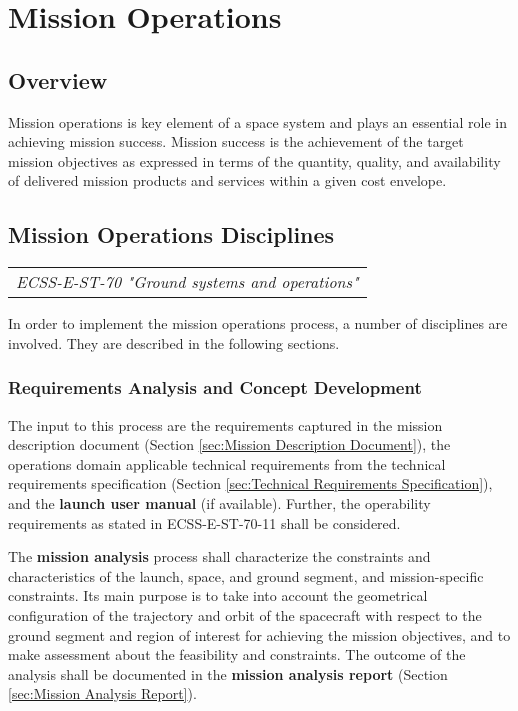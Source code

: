\chapter{Mission Operations}
\label{chap:Mission Operations}

\section{Overview}

Mission operations is key element of a space system and plays an essential role in achieving mission success. Mission success is the achievement of the target mission objectives as expressed in terms of the quantity, quality, and availability of delivered mission products and services within a given cost envelope.

\section{Mission Operations Disciplines}

\begin{tabular}{l}
\textit{ECSS-E-ST-70 "Ground systems and operations" \cite{ECSS-E-ST-70}}
\end{tabular}

In order to implement the mission operations process, a number of disciplines are involved. They are described in the following sections.

\subsection{Requirements Analysis and Concept Development}

The input to this process are the requirements captured in the mission description document (Section \ref{sec:Mission Description Document}), the operations domain applicable technical requirements from the technical requirements specification (Section \ref{sec:Technical Requirements Specification}), and the \textbf{launch user manual} (if available). Further, the operability requirements as stated in ECSS-E-ST-70-11 \cite{ECSS-E-ST-70-11} shall be considered.

The \textbf{mission analysis} process shall characterize the constraints and characteristics of the launch, space, and ground segment, and mission-specific constraints. Its main purpose is to take into account the geometrical configuration of the trajectory and orbit of the spacecraft with respect to the ground segment and region of interest for achieving the mission objectives, and to make assessment about the feasibility and constraints. The outcome of the analysis shall be documented in the \textbf{mission analysis report} (Section \ref{sec:Mission Analysis Report}).


